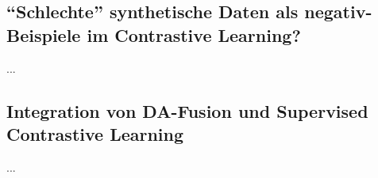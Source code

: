 \subsection{“Schlechte” synthetische Daten als negativ-Beispiele im Contrastive Learning?}


...

\subsection{Integration von DA-Fusion und Supervised Contrastive Learning}

...